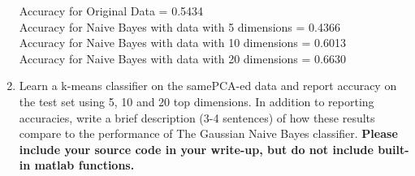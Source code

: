\begin{enumerate}
Accuracy for Original Data = 0.5434 \\
Accuracy for Naive Bayes with data with 5 dimensions = 0.4366 \\
Accuracy for Naive Bayes with data with 10 dimensions = 0.6013 \\
Accuracy for Naive Bayes with data with 20 dimensions = 0.6630 \\


\item {} Learn a k-means classifier on
  the samePCA-ed data and report accuracy on the test set using 5, 10 and
  20 top dimensions.  In addition to reporting accuracies, write a brief
  description (3-4 sentences) of how these results compare to the
  performance of The Gaussian Naive Bayes classifier. {\bf Please include your 
    source code in your write-up, but do not include built-in matlab functions.} \\


\end{enumerate}
